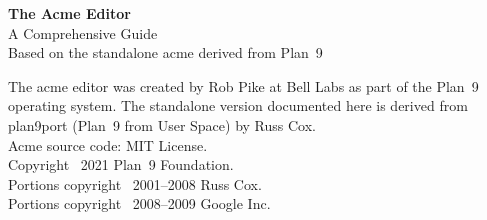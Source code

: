 \documentclass[11pt,openany,twoside]{memoir}
\begin{document}
\frontmatter

\thispagestyle{empty}
\vspace*{2in}
\begin{center}
{\Huge\bfseries The Acme Editor}\\[0.5em]
{\Large A Comprehensive Guide}\\[2em]
{\large Based on the standalone acme derived from Plan~9}\\[4em]
\end{center}
\vfill
\newpage

\thispagestyle{empty}
\vspace*{\fill}
\noindent
The acme editor was created by Rob Pike at Bell Labs as part of
the Plan~9 operating system.  The standalone version documented here
is derived from plan9port (Plan~9 from User Space) by Russ Cox.\\[1em]
\noindent
Acme source code: MIT License.\\
Copyright \textcopyright\ 2021 Plan~9 Foundation.\\
Portions copyright \textcopyright\ 2001--2008 Russ Cox.\\
Portions copyright \textcopyright\ 2008--2009 Google Inc.\\[2em]
\newpage

\tableofcontents
\newpage

\mainmatter












\appendix







\backmatter


\printindex
\end{document}
